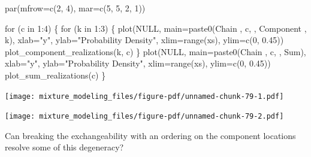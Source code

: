 \documentclass[
  letterpaper,
  DIV=11,
  numbers=noendperiod]{scrartcl}
\newenvironment{Shaded}{\begin{snugshade}}{\end{snugshade}}
\newcommand{\AttributeTok}[1]{\textcolor[rgb]{0.40,0.45,0.13}{#1}}
\newcommand{\ConstantTok}[1]{\textcolor[rgb]{0.56,0.35,0.01}{#1}}
\newcommand{\ControlFlowTok}[1]{\textcolor[rgb]{0.00,0.23,0.31}{#1}}
\newcommand{\DecValTok}[1]{\textcolor[rgb]{0.68,0.00,0.00}{#1}}
\newcommand{\FloatTok}[1]{\textcolor[rgb]{0.68,0.00,0.00}{#1}}
\newcommand{\FunctionTok}[1]{\textcolor[rgb]{0.28,0.35,0.67}{#1}}
\newcommand{\NormalTok}[1]{\textcolor[rgb]{0.00,0.23,0.31}{#1}}
\newcommand{\SpecialCharTok}[1]{\textcolor[rgb]{0.37,0.37,0.37}{#1}}
\newcommand{\StringTok}[1]{\textcolor[rgb]{0.13,0.47,0.30}{#1}}
\begin{document}
\begin{Shaded}
\begin{Highlighting}[]
\FunctionTok{par}\NormalTok{(}\AttributeTok{mfrow=}\FunctionTok{c}\NormalTok{(}\DecValTok{2}\NormalTok{, }\DecValTok{4}\NormalTok{), }\AttributeTok{mar=}\FunctionTok{c}\NormalTok{(}\DecValTok{5}\NormalTok{, }\DecValTok{5}\NormalTok{, }\DecValTok{2}\NormalTok{, }\DecValTok{1}\NormalTok{))}

\ControlFlowTok{for}\NormalTok{ (c }\ControlFlowTok{in} \DecValTok{1}\SpecialCharTok{:}\DecValTok{4}\NormalTok{) \{}
  \ControlFlowTok{for}\NormalTok{ (k }\ControlFlowTok{in} \DecValTok{1}\SpecialCharTok{:}\DecValTok{3}\NormalTok{) \{}
    \FunctionTok{plot}\NormalTok{(}\ConstantTok{NULL}\NormalTok{, }\AttributeTok{main=}\FunctionTok{paste0}\NormalTok{(}\StringTok{\textquotesingle{}Chain \textquotesingle{}}\NormalTok{, c, }\StringTok{\textquotesingle{}, Component \textquotesingle{}}\NormalTok{, k),}
         \AttributeTok{xlab=}\StringTok{"y"}\NormalTok{, }\AttributeTok{ylab=}\StringTok{"Probability Density"}\NormalTok{,}
         \AttributeTok{xlim=}\FunctionTok{range}\NormalTok{(xs), }\AttributeTok{ylim=}\FunctionTok{c}\NormalTok{(}\DecValTok{0}\NormalTok{, }\FloatTok{0.45}\NormalTok{))}
    \FunctionTok{plot\_component\_realizations}\NormalTok{(k, c)}
\NormalTok{  \}}
  \FunctionTok{plot}\NormalTok{(}\ConstantTok{NULL}\NormalTok{, }\AttributeTok{main=}\FunctionTok{paste0}\NormalTok{(}\StringTok{\textquotesingle{}Chain \textquotesingle{}}\NormalTok{, c, }\StringTok{\textquotesingle{}, Sum\textquotesingle{}}\NormalTok{),}
       \AttributeTok{xlab=}\StringTok{"y"}\NormalTok{, }\AttributeTok{ylab=}\StringTok{"Probability Density"}\NormalTok{,}
       \AttributeTok{xlim=}\FunctionTok{range}\NormalTok{(xs), }\AttributeTok{ylim=}\FunctionTok{c}\NormalTok{(}\DecValTok{0}\NormalTok{, }\FloatTok{0.45}\NormalTok{))}
  \FunctionTok{plot\_sum\_realizations}\NormalTok{(c)}
\NormalTok{\}}
\end{Highlighting}
\end{Shaded}

\texttt{[image: mixture\_modeling\_files/figure-pdf/unnamed-chunk-79-1.pdf]}

\texttt{[image: mixture\_modeling\_files/figure-pdf/unnamed-chunk-79-2.pdf]}

Can breaking the exchangeability with an ordering on the component
locations resolve some of this degeneracy?
\end{document}
